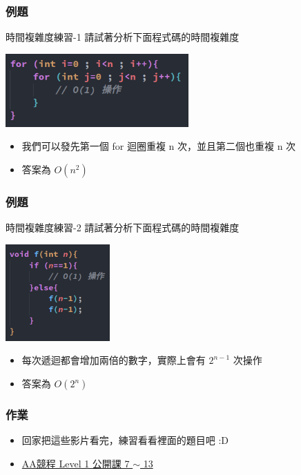 \documentclass[mathserif]{beamer}
\begin{document}
\begin{frame}
    \frametitle{例題}
    \begin{block}{時間複雜度練習-1}
        請試著分析下面程式碼的時間複雜度

        \vspace{0.5cm}
        \includegraphics[width=7.0cm]{img/code_1.png}
    \end{block}
    \begin{itemize}
        \item<2-> 我們可以發先第一個 for 迴圈重複 n 次，並且第二個也重複 n 次
        \item<2-> 答案為 $O(n^2)$
    \end{itemize}
\end{frame}

\begin{frame}
    \frametitle{例題}
    \begin{block}{時間複雜度練習-2}
        請試著分析下面程式碼的時間複雜度

        \vspace{0.5cm}
        \includegraphics[width=4.0cm]{img/code_2.png}
    \end{block}
    \begin{itemize}
        \item<2-> 每次遞迴都會增加兩倍的數字，實際上會有 $2^{n-1}$ 次操作
        \item<2-> 答案為 $O(2^n)$
    \end{itemize}
\end{frame}

\begin{frame}
    \frametitle{作業}
    \begin{itemize}
        \item 回家把這些影片看完，練習看看裡面的題目吧 :D
        \item \href{https://youtube.com/playlist?list=PLuV4P3EY8fXl-2qmLTZVWS3deHyxxWLUI}{AA競程 Level 1 公開課 7 $\sim$ 13}
    \end{itemize}
\end{frame}
\end{document}

